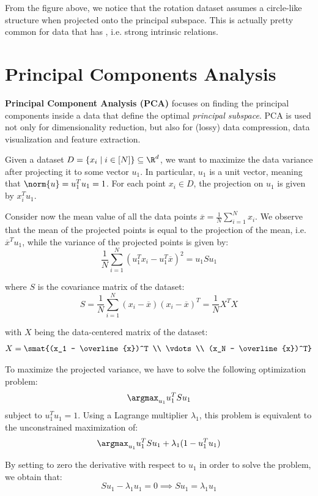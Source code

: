\documentclass[a4paper, 12pt]{report}
\begin{document}
    From the figure above, we notice that the rotation dataset assumes a circle-like structure when projected onto the principal subspace. This is actually pretty common for data that has , i.e. strong intrinsic relations.

    \newpage

    \section{Principal Components Analysis}

    \textbf{Principal Component Analysis (PCA)} focuses on finding the principal components inside a data that define the optimal \textit{principal subspace}. PCA is used not only for dimensionality reduction, but also for (lossy) data compression, data visualization and feature extraction.

    Given a dataset $D = \{x_i \mid i \in [N]\} \subseteq \R^d$, we want to maximize the data variance after projecting it to some vector $u_1$. In particular, $u_1$ is a unit vector, meaning that $\norm{u} = u_1^Tu_1 = 1$. For each point $x_i \in D$, the projection on $u_1$ is given by $x_i^Tu_1$.
    
    Consider now the mean value of all the data points $\overline{x} = \frac{1}{N} \sum_{i = 1}^N x_i$. We observe that the mean of the projected points is equal to the projection of the mean, i.e. $\overline{x}^T u_1$, while the variance of the projected points is given by:
    \[\frac{1}{N} \sum_{i = 1}^N (u_1^Tx_i - u_1^T \overline{x})^2 = u_1 S u_1\]

    where $S$ is the covariance matrix of the dataset:
    \[S = \frac{1}{N} \sum_{i = 1}^N (x_i - \overline{x}) (x_i - \overline{x})^T = \frac{1}{N}X^TX\]

    with $X$ being the data-centered matrix of the dataset:
    \[X = \smat{(x_1 - \overline{x})^T \\ \vdots \\ (x_N - \overline{x})^T} \]

    To maximize the projected variance, we have to solve the following optimization problem:
    \[\argmax_{u_1} u_1^T S u_1\]
    subject to $u_1^T u_1 = 1$. Using a Lagrange multiplier $\lambda_1$, this problem is equivalent to the unconstrained maximization of:
    \[\argmax_{u_1} u_1^T S u_1+ \lambda_1 (1-u_1^T u_1)\]

    By setting to zero the derivative with respect to $u_1$ in order to solve the problem, we obtain that:
    \[S u_1 - \lambda_1 u_1 = 0 \implies S u_1 = \lambda_1 u_1\]
\end{document}
